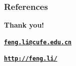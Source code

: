 \documentclass{beamer}
\begin{document}
\begin{frame}[allowframebreaks]
  \frametitle{References}
  
  
\end{frame}

\begin{frame}[plain]
  \addtocounter{framenumber}{-1}
  \begin{center}
    {\color{SUblue} \textbf{\Huge Thank you!}}
    \vspace{1cm}

    {\texttt{\textbf{\url{feng.li@cufe.edu.cn}}}}

    \vspace{1cm}

    {\texttt{\textbf{\url{http://feng.li/}}}}

  \end{center}
\end{frame}
\end{document}
